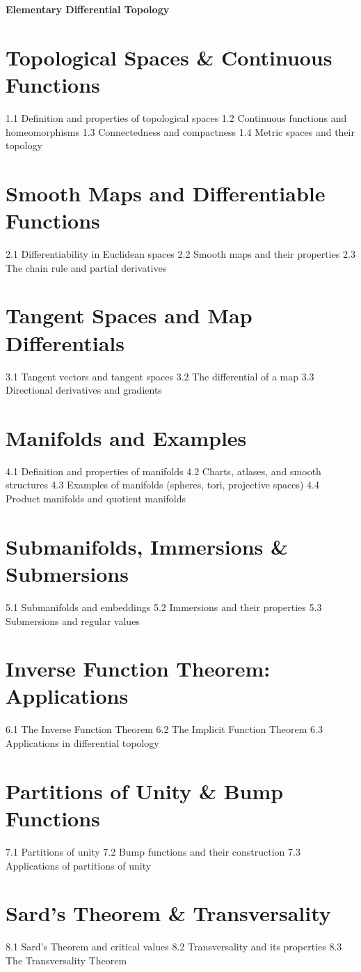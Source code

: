 {\LARGE \bf{Elementary Differential Topology}}
\section{Topological Spaces \& Continuous Functions}
1.1 Definition and properties of topological spaces
1.2 Continuous functions and homeomorphisms
1.3 Connectedness and compactness
1.4 Metric spaces and their topology
\section{Smooth Maps and Differentiable Functions}
2.1 Differentiability in Euclidean spaces
2.2 Smooth maps and their properties
2.3 The chain rule and partial derivatives
\section{Tangent Spaces and Map Differentials}
3.1 Tangent vectors and tangent spaces
3.2 The differential of a map
3.3 Directional derivatives and gradients
\section{Manifolds and Examples}
4.1 Definition and properties of manifolds
4.2 Charts, atlases, and smooth structures
4.3 Examples of manifolds (spheres, tori, projective spaces)
4.4 Product manifolds and quotient manifolds
\section{Submanifolds, Immersions \& Submersions}
5.1 Submanifolds and embeddings
5.2 Immersions and their properties
5.3 Submersions and regular values
\section{Inverse Function Theorem: Applications}
6.1 The Inverse Function Theorem
6.2 The Implicit Function Theorem
6.3 Applications in differential topology
\section{Partitions of Unity \& Bump Functions}
7.1 Partitions of unity
7.2 Bump functions and their construction
7.3 Applications of partitions of unity
\section{Sard's Theorem \& Transversality}
8.1 Sard's Theorem and critical values
8.2 Transversality and its properties
8.3 The Transversality Theorem
